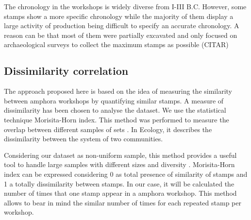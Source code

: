 \documentclass[review]{elsarticle}
\begin{document}
The chronology in the workshops is widely diverse from I-III B.C. However, some stamps show a more specific chronology while the majority of them display a large activity of production being difficult to specify an accurate chronology. A reason can be that most of them were partially excavated and only focused on archaeological surveys to collect the maximum stamps as possible (CITAR) 



\subsection{Dissimilarity correlation}


The approach proposed here is based on the idea of measuring the similarity between amphora workshops by quantifying similar stamps. A measure of dissimilarity has been chosen to analyse the dataset. We use the statistical technique Morisita-Horn index. This method was performed to measure the overlap between different samples of sets \citep{morisita_measuring_1959, horn_measurement_1966}. In Ecology, it describes the dissimilarity between the system of two communities. 

Considering our dataset as non-uniform sample, this method provides a useful tool to handle large samples with different sizes and diversity \citep{wolda_similarity_1981}. Morisita-Horn index can be expressed considering 0 as total presence of similarity of stamps and 1 a totally dissimilarity between stamps. In our case, it will be calculated the number of times that one stamp appear in a amphora workshop. This method allows to bear in mind the similar number of times for each repeated stamp per workshop. 
\end{document}
